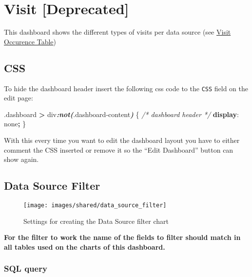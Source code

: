\documentclass[
]{book}
\newenvironment{Shaded}{\begin{snugshade}}{\end{snugshade}}
\newcommand{\CommentTok}[1]{\textcolor[rgb]{0.56,0.35,0.01}{\textit{#1}}}
\newcommand{\DecValTok}[1]{\textcolor[rgb]{0.00,0.00,0.81}{#1}}
\newcommand{\FunctionTok}[1]{\textcolor[rgb]{0.00,0.00,0.00}{#1}}
\newcommand{\InformationTok}[1]{\textcolor[rgb]{0.56,0.35,0.01}{\textbf{\textit{#1}}}}
\newcommand{\KeywordTok}[1]{\textcolor[rgb]{0.13,0.29,0.53}{\textbf{#1}}}
\newcommand{\NormalTok}[1]{#1}
\newcommand{\OperatorTok}[1]{\textcolor[rgb]{0.81,0.36,0.00}{\textbf{#1}}}
\begin{document}
\hypertarget{visit-deprecated}{%
\section{Visit {[}Deprecated{]}}\label{visit-deprecated}}

This dashboard shows the different types of visits per data source (see \href{https://ohdsi.github.io/CommonDataModel/cdm531.html\#visit_occurrence}{Visit Occurence Table})

\hypertarget{css-5}{%
\subsection*{CSS}\label{css-5}}

To hide the dashboard header insert the following css code to the \texttt{CSS} field on the edit page:

\begin{Shaded}
\begin{Highlighting}[]
\FunctionTok{.dashboard} \OperatorTok{\textgreater{}}\NormalTok{ div}\InformationTok{:not(}\FunctionTok{.dashboard{-}content}\InformationTok{)}\NormalTok{ \{  }\CommentTok{/* dashboard header */}
  \KeywordTok{display}\NormalTok{: }\DecValTok{none}\OperatorTok{;}
\NormalTok{\}}
\end{Highlighting}
\end{Shaded}

With this every time you want to edit the dashboard layout you have to either comment the CSS inserted
or remove it so the ``Edit Dashboard'' button can show again.

\hypertarget{data-source-filter-3}{%
\subsection*{Data Source Filter}\label{data-source-filter-3}}

\begin{figure}
\texttt{[image: images/shared/data\_source\_filter]} \caption{Settings for creating the Data Source filter chart}\label{fig:dataSourceFilter}
\end{figure}

\textbf{For the filter to work the name of the fields to filter should match in all tables used on the charts of this dashboard.}

\hypertarget{sql-query-15}{%
\subsubsection*{SQL query}\label{sql-query-15}}
\end{document}
